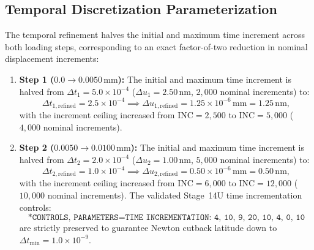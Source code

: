 \subsection{Temporal Discretization Parameterization}
\label{subsec:stage14ur_parameterization}

The temporal refinement halves the initial and maximum time increment across both loading steps, corresponding to an exact factor-of-two reduction in nominal displacement increments:
\begin{enumerate}
    \item \textbf{Step 1 ($0.0 \to 0.0050\,\mathrm{mm}$):} The initial and maximum time increment is halved from $\Delta t_1 = 5.0\times 10^{-4}$ ($\Delta u_1 = 2.50\,\mathrm{nm}$, $2{,}000$ nominal increments) to:
    \begin{equation}
    \Delta t_{1,\mathrm{refined}} = 2.5\times 10^{-4} \implies \Delta u_{1,\mathrm{refined}} = 1.25\times 10^{-6}\,\mathrm{mm} = 1.25\,\mathrm{nm},
    \end{equation}
    with the increment ceiling increased from $\mathrm{INC}=2{,}500$ to $\mathrm{INC}=5{,}000$ ($4{,}000$ nominal increments).
    \item \textbf{Step 2 ($0.0050 \to 0.0100\,\mathrm{mm}$):} The initial and maximum time increment is halved from $\Delta t_2 = 2.0\times 10^{-4}$ ($\Delta u_2 = 1.00\,\mathrm{nm}$, $5{,}000$ nominal increments) to:
    \begin{equation}
    \Delta t_{2,\mathrm{refined}} = 1.0\times 10^{-4} \implies \Delta u_{2,\mathrm{refined}} = 0.50\times 10^{-6}\,\mathrm{mm} = 0.50\,\mathrm{nm},
    \end{equation}
    with the increment ceiling increased from $\mathrm{INC}=6{,}000$ to $\mathrm{INC}=12{,}000$ ($10{,}000$ nominal increments). The validated Stage~14U time incrementation controls:
    \begin{equation}
    \texttt{*CONTROLS, PARAMETERS=TIME INCREMENTATION: 4, 10, 9, 20, 10, 4, 0, 10}
    \end{equation}
    are strictly preserved to guarantee Newton cutback latitude down to $\Delta t_{\min} = 1.0\times 10^{-9}$.
\end{enumerate}


